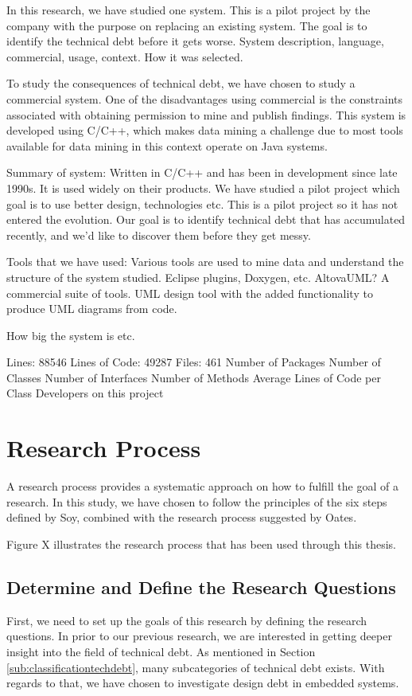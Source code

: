 In this research, we have studied one system. This is a pilot project by the company with the purpose on replacing an existing system. The goal is to identify the technical debt before it gets worse. System description, language, commercial, usage, context. How it was selected.


To study the consequences of technical debt, we have chosen to study a commercial system. One of the disadvantages using commercial is the constraints associated with obtaining permission to mine and publish findings. This system is developed using C/C++, which makes data mining a challenge due to most tools available for data mining in this context operate on Java systems. 

Summary of system: Written in C/C++ and has been in development since late 1990s. It is used widely on their products. We have studied a pilot project which goal is to use better design, technologies etc. This is a pilot project so it has not entered the evolution. Our goal is to identify technical debt that has accumulated recently, and we'd like to discover them before they get messy. 

Tools that we have used: Various tools are used to mine data and understand the structure of the system studied. Eclipse plugins, Doxygen, etc. AltovaUML? A commercial suite of tools. UML design tool with the added functionality to produce UML diagrams from code. 


How big the system is etc.

Lines: 88546
Lines of Code: 49287
Files: 461
Number of Packages
Number of Classes
Number of Interfaces
Number of Methods
Average Lines of Code per Class
Developers on this project






\section{Research Process}
A research process provides a systematic approach on how to fulfill the goal of a research. In this study, we have chosen to follow the principles of the six steps defined by Soy\cite{soysusan}, combined with the research process suggested by Oates\cite{Oates:2006:RIS:1202299}. 

Figure X illustrates the research process that has been used through this thesis. 

\subsection{Determine and Define the Research Questions} %
First, we need to set up the goals of this research by defining the research questions. In prior to our previous research\cite{forprosjekt}, we are interested in getting deeper insight into the field of technical debt. As mentioned in Section \ref{sub:classificationtechdebt}, many subcategories of technical debt exists. With regards to that, we have chosen to investigate design debt in embedded systems.

